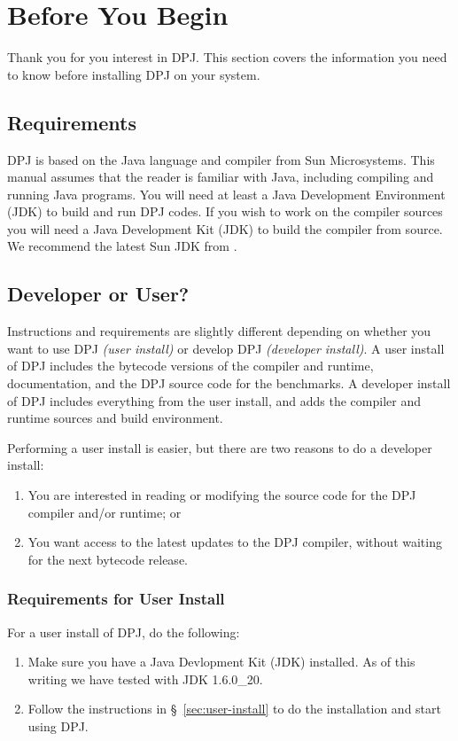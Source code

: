 \section{Before You Begin%
\label{sec:build}}

Thank you for you interest in DPJ.  This section covers the
information you need to know before installing DPJ on your system.

\subsection{Requirements%
\label{sec:requirements}}

DPJ is based on the Java language and  compiler from Sun
Microsystems. This manual assumes that the reader is familiar with
Java, including compiling and running Java programs.  You will need at
least a Java Development Environment (JDK) to build and run DPJ codes.  If you wish
to work on the compiler sources you will need a Java Development Kit
(JDK) to build the compiler from source.  We recommend the latest Sun
JDK from .

\subsection{Developer or User?}

Instructions and requirements are slightly different depending on
whether you want to use DPJ \emph{(user install)} or develop DPJ
\emph{(developer install)}.  A user install of DPJ includes the
bytecode versions of the compiler and runtime, documentation, and the
DPJ source code for the benchmarks.  A developer install of DPJ
includes everything from the user install, and adds the compiler and
runtime sources and build environment.

Performing a user install is easier, but there are two reasons to do a
developer install:
%
\begin{enumerate}
%
\item You are interested in reading or modifying the source code for
  the DPJ compiler and/or runtime; or
%
\item You want access to the latest updates to the DPJ compiler,
  without waiting for the next bytecode release.
\end{enumerate}


\subsubsection{Requirements for User Install%
\label{sec:runDPJ}}
%
For a user install of DPJ, do the following:
\begin{enumerate}
\item Make sure you have a Java Devlopment Kit (JDK) installed.  As of
  this writing we have tested with JDK 1.6.0\_20.
\item Follow the instructions in \S~\ref{sec:user-install} to do
  the installation and start using DPJ.
\end{enumerate}

